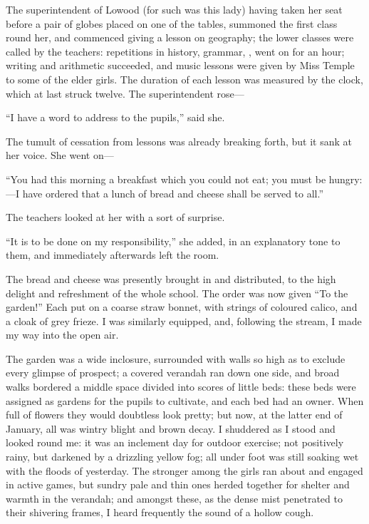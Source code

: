 The superintendent of Lowood (for such was this lady) having taken her
seat before a pair of globes placed on one of the tables, summoned the
first class round her, and commenced giving a lesson on geography; the
lower classes were called by the teachers: repetitions in history,
grammar, \etc, went on for an hour; writing and arithmetic succeeded,
and music lessons were given by Miss Temple to some of the elder girls.
The duration of each lesson was measured by the clock, which at last
struck twelve. The superintendent rose---

\enquote{I have a word to address to the pupils,} said she.

The tumult of cessation from lessons was already breaking forth, but it
sank at her voice. She went on---

\enquote{You had this morning a breakfast which you could not eat; you
	must be hungry:---I have ordered that a lunch of bread and cheese shall
	be served to all.}

The teachers looked at her with a sort of surprise.

\enquote{It is to be done on my responsibility,} she added, in an
explanatory tone to them, and immediately afterwards left the room.

The bread and cheese was presently brought in and distributed, to the
high delight and refreshment of the whole school. The order was now
given \enquote{To the garden!} Each put on a coarse straw bonnet, with
strings of coloured calico, and a cloak of grey frieze. I was similarly
equipped, and, following the stream, I made my way into the open air.

The garden was a wide inclosure, surrounded with walls so high as to
exclude every glimpse of prospect; a covered verandah ran down one side,
and broad walks bordered a middle space divided into scores of little
beds: these beds were assigned as gardens for the pupils to cultivate,
and each bed had an owner. When full of flowers they would doubtless
look pretty; but now, at the latter end of January, all was wintry
blight and brown decay. I shuddered as I stood and looked round me: it
was an inclement day for outdoor exercise; not positively rainy, but
darkened by a drizzling yellow fog; all under foot was still soaking wet
with the floods of yesterday. The stronger among the girls ran about
and engaged in active games, but sundry pale and thin ones herded
together for shelter and warmth in the verandah; and amongst these, as
the dense mist penetrated to their shivering frames, I heard frequently
the sound of a hollow cough.

